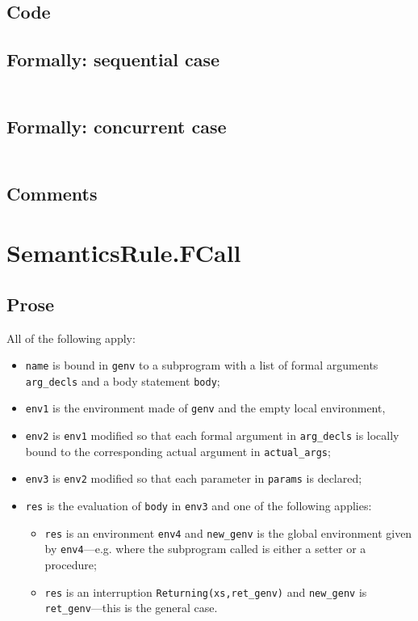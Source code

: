 \documentclass{book}
\begin{document}
  \subsection{Code}

  \subsection{Formally: sequential case}
  \begin{align}
  \end{align} 

  \subsection{Formally: concurrent case}
  \begin{align}
  \end{align} 

  \subsection{Comments}

\section{SemanticsRule.FCall \label{sec:SemanticsRule.FCall}}

  \subsection{Prose}
  All of the following apply:
  \begin{itemize}
  \item \texttt{name} is bound in \texttt{genv} to a subprogram with a list of formal arguments
    \texttt{arg\_decls} and a body statement \texttt{body};
  \item \texttt{env1} is the environment made of \texttt{genv} and the empty local environment,
  \item \texttt{env2} is \texttt{env1} modified so that each formal argument in \texttt{arg\_decls} is
    locally bound to the corresponding actual argument in \texttt{actual\_args};
  \item \texttt{env3} is \texttt{env2} modified so that each parameter in \texttt{params} is declared;
  \item \texttt{res} is the evaluation of \texttt{body} in \texttt{env3} and one of the following
    applies:
      \begin{itemize}
      \item \texttt{res} is an environment \texttt{env4} and \texttt{new\_genv} is the global environment
        given by \texttt{env4}---e.g. where the subprogram called is either a setter or
        a procedure;
      \item \texttt{res} is an interruption \texttt{Returning(xs,ret\_genv)} and \texttt{new\_genv} is
        \texttt{ret\_genv}---this is the general case.
      \end{itemize}
  \end{itemize}
\end{document}
